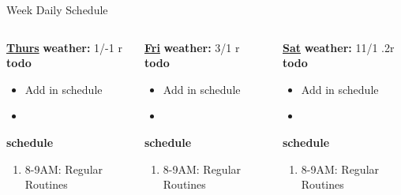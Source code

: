 \begin{columns}
\begin{column}{0.333\columnwidth}
\begin{columns}
\begin{column}{0.6\linewidth}
\begin{block}{Week Daily Schedule}
\begin{columns}
          \begin{column}{0.14\textwidth}{\small \underline{\bf Thurs}}
            {\tiny \bf weather: } {\tiny 1/-1 r }\\ 
            {\tiny \bf todo} \\ 
            \begin{itemize}
              \tiny \item \tiny Add in schedule
            \item \tiny 
            \end{itemize} 
                {\tiny {\bf schedule}} \\
                \begin{enumerate} 
                  \tiny \item \tiny 8-9AM: Regular Routines 
                \end{enumerate}
          \end{column} 
          
          \begin{column}{0.14\textwidth}{\small \underline{\bf Fri}}
            {\tiny \bf weather: } {\tiny 3/1 r} \\ 
            {\tiny \bf todo} \\ 
            \begin{itemize}
              \tiny \item \tiny Add in schedule
            \item \tiny 
            \end{itemize} 
                {\tiny \bf schedule} \\
                \begin{enumerate} 
                  \tiny \item \tiny 8-9AM: Regular Routines 
                \end{enumerate}
          \end{column}

          \begin{column}{0.15\textwidth}{\small \underline{\bf Sat}}
            {\tiny \bf weather: } {\tiny 11/1 .2r} \\ 
            { \tiny \bf todo} \\ 
            \begin{itemize}
              \tiny \item \tiny Add in schedule
            \item \tiny 
            \end{itemize} 
                {\tiny \bf schedule} \\
                \begin{enumerate} 
                  \tiny \item \tiny 8-9AM: Regular Routines 
                \end{enumerate}
          \end{column}
          

\end{columns}
\end{block}
\end{column}
\end{columns}
\end{column}
\end{columns}
